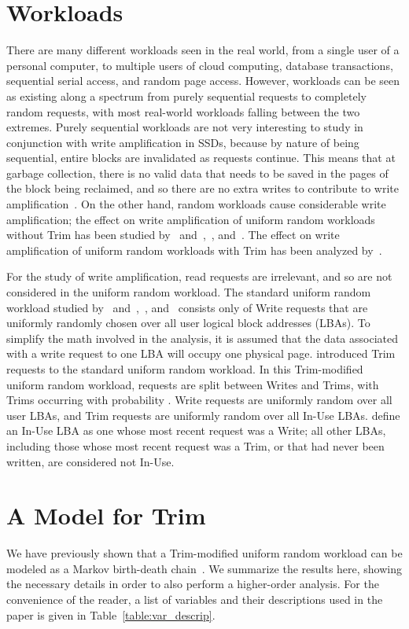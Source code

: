 \documentclass[prodmode,acmtos]{acmsmall}
\begin{document}
\section{Workloads}
There are many different workloads seen in the real world, from a single user of a personal computer, to multiple users of cloud computing, database transactions, sequential serial access, and random page access.  However, workloads can be seen as existing along a spectrum from purely sequential requests to completely random requests, with most real-world workloads falling between the two extremes.  Purely sequential workloads are not very interesting to study in conjunction with write amplification in SSDs, because by nature of being sequential, entire blocks are invalidated as requests continue.  This means that at garbage collection, there is no valid data that needs to be saved in the pages of the block being reclaimed, and so there are no extra writes to contribute to write amplification~\cite{Hu2009}.  On the other hand, random workloads cause considerable write amplification; the effect on write amplification of uniform random workloads without Trim has been studied by~ and~,~, and~.  The effect on write amplification of uniform random workloads with Trim has been analyzed by~.

For the study of write amplification, read requests are irrelevant, and so are not considered in the uniform random workload.  The standard uniform random workload studied by~ and~,~, and~ consists only of Write requests that are uniformly randomly chosen over all  user logical block addresses (LBAs).  To simplify the math involved in the analysis, it is assumed that the data associated with a write request to one LBA will occupy one physical page.   introduced Trim requests to the standard uniform random workload.  In this Trim-modified uniform random workload, requests are split between Writes and Trims, with Trims occurring with probability .  Write requests are uniformly random over all  user LBAs, and Trim requests are uniformly random over all In-Use LBAs.   define an In-Use LBA as one whose most recent request was a Write; all other LBAs, including those whose most recent request was a Trim, or that had never been written, are considered not In-Use.


\section{A Model for Trim}\label{sec:trim_model_markov}
We have previously shown that a Trim-modified uniform random workload can be modeled as a Markov birth-death chain~\cite{frankie2012_acmse}.  We summarize the results here, showing the necessary details in order to also perform a higher-order analysis.  For the convenience of the reader, a list of variables and their descriptions used in the paper is given in Table~\ref{table:var_descrip}.
\end{document}
